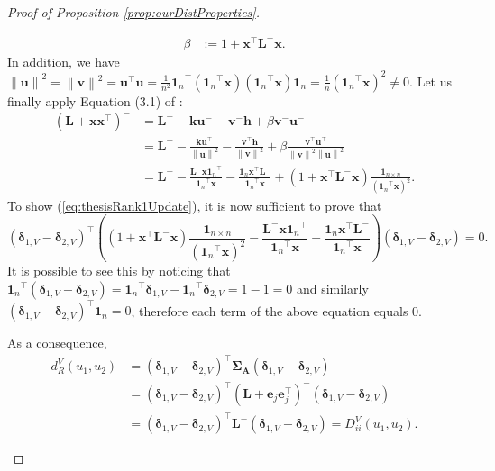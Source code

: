 \documentclass[12pt]{article}
\theoremstyle{plain}
\theoremstyle{remark}
\newcommand{\norm}[1]{\left\lVert #1 \right\rVert}
\newcommand{\round}[1]{\left( #1 \right)}
\newcommand{\onen}[0]{{\mathbf{1}_{n}}}
\newcommand{\onenn}[0]{{\mathbf{1}_{n\times n}}}
\newcommand{\dVec}[1]{{\bm{#1}}}            %
\newcommand{\latMatr}[1]{\mathbf{#1}}          %
\newcommand{\grMatr}[1]{{\boldsymbol{#1}}}   %
\begin{document}
\begin{proof}[Proof of Proposition \ref{prop:ourDistProperties}]
\begin{enumerate}
\begin{align*}
                 \beta &:= 1+\dVec x^\top \latMatr L^- \dVec x.
             \end{align*}
             In addition, we have $\norm{\dVec u}^2=\norm{\dVec v}^2= \dVec u^\top \dVec u = \frac{1}{n^2}\onen^\top (\onen^\top \dVec x)(\onen^\top \dVec x) \onen = \frac{1}{n}(\onen^\top \dVec x)^2\ne 0$. Let us finally apply Equation (3.1) of \cite{meyer_generalized_1973}:
             \begin{align*}
                 \round{{\latMatr{L}}+\dVec x \dVec x^\top}^-&={\latMatr{L}}^- - \dVec k \dVec u^- - \dVec v^- \dVec h +\beta \dVec v^- \dVec u^-\\
                 &={\latMatr{L}}^--\frac{\dVec k\dVec u^\top}{\norm{\dVec u}^2} - \frac{\dVec v^\top \dVec h}{\norm{\dVec v}^2} + \beta \frac{\dVec v^\top \dVec u^\top}{\norm{\dVec v}^2 \norm{\dVec u}^2}\\
                 &={\latMatr{L}}^- - \frac{{\latMatr{L}}^- \dVec x \onen^\top}{\onen^\top \dVec x} - \frac{\onen \dVec x^\top {\latMatr{L}}^-}{\onen^\top \dVec x} + \round{1+ \dVec x^\top {\latMatr{L}}^- \dVec x} \frac{\onenn}{\round{\onen^\top \dVec x}^2}.
             \end{align*}
             To show (\ref{eq:thesisRank1Update}), it is now sufficient to prove that
             \begin{equation*}
                 \round{\dVec{\delta}_{1,V}-\dVec{\delta}_{2,V}}^\top \round{\round{1+ \dVec x^\top {\latMatr{L}}^- \dVec x} \frac{\onenn}{\round{\onen^\top \dVec x}^2}- \frac{{\latMatr{L}}^- \dVec x \onen^\top}{\onen^\top \dVec x} - \frac{\onen \dVec x^\top {\latMatr{L}}^-}{\onen^\top \dVec x}}\round{\dVec{\delta}_{1,V}-\dVec{\delta}_{2,V}}=0.
             \end{equation*}
             It is possible to see this by noticing that $\onen^\top \round{\dVec{\delta}_{1,V}-\dVec{\delta}_{2,V}}=\onen^\top \dVec{\delta}_{1,V} - \onen^\top \dVec{\delta}_{2,V}= 1-1=0$ and similarly $\round{\dVec{\delta}_{1,V}-\dVec{\delta}_{2,V}}^\top \onen=0$, therefore each term of the above equation equals 0.\par
             As a consequence,
             \begin{align*}
                 d_{R}^V(u_1,u_2)&=\round{\dVec{\delta}_{1,V}-\dVec{\delta}_{2,V}}^\top {\grMatr{\Sigma}}_{\latMatr{A}} \round{\dVec{\delta}_{1,V}-\dVec{\delta}_{2,V}} \\
                 &= \round{\dVec{\delta}_{1,V}-\dVec{\delta}_{2,V}}^\top \round{{\latMatr{L}}+\dVec e_j \dVec e_j^\top}^- \round{\dVec{\delta}_{1,V}-\dVec{\delta}_{2,V}} \\
                 &= \round{\dVec{\delta}_{1,V}-\dVec{\delta}_{2,V}}^\top {\latMatr{L}}^- \round{\dVec{\delta}_{1,V}-\dVec{\delta}_{2,V}} = {D}_{ii}^V(u_1,u_2).
             \end{align*}
             

\end{enumerate}
\end{proof}
\end{document}
